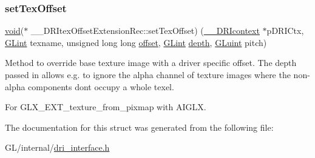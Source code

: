 \mbox{\label{struct_____d_r_itex_offset_extension_rec_a51d81b474170dc573b320c64c7fe8641}} 
\subsubsection{\texorpdfstring{set\+Tex\+Offset}{setTexOffset}}
{\footnotesize\ttfamily \hyperlink{_s_d_l__opengles2__gl2ext_8h_ae5d8fa23ad07c48bb609509eae494c95}{void}($\ast$ \+\_\+\+\_\+\+D\+R\+Itex\+Offset\+Extension\+Rec\+::set\+Tex\+Offset) (\hyperlink{dri__interface_8h_a3fd295cba82b5a3d79f1ee7e12bfb908}{\+\_\+\+\_\+\+D\+R\+Icontext} $\ast$p\+D\+R\+I\+Ctx, \hyperlink{gl_8h_acebcc1c5663f14ebde1d16831e5fed94}{G\+Lint} texname, unsigned long long \hyperlink{glcorearb_8h_ac915cd848f42b26af51745f204a3b9af}{offset}, \hyperlink{gl_8h_acebcc1c5663f14ebde1d16831e5fed94}{G\+Lint} \hyperlink{gl_8h_aa8bd8cf1eef34712fdb6ad58b540a2ee}{depth}, \hyperlink{gl_8h_a68c4714e43d8e827d80759f9cb864f3c}{G\+Luint} pitch)}

Method to override base texture image with a driver specific \textquotesingle{}offset\textquotesingle{}. The depth passed in allows e.\+g. to ignore the alpha channel of texture images where the non-\/alpha components don\textquotesingle{}t occupy a whole texel.

For G\+L\+X\+\_\+\+E\+X\+T\+\_\+texture\+\_\+from\+\_\+pixmap with A\+I\+G\+LX. 

The documentation for this struct was generated from the following file\+:\begin{DoxyCompactItemize}
\item 
G\+L/internal/\hyperlink{dri__interface_8h}{dri\+\_\+interface.\+h}\end{DoxyCompactItemize}
